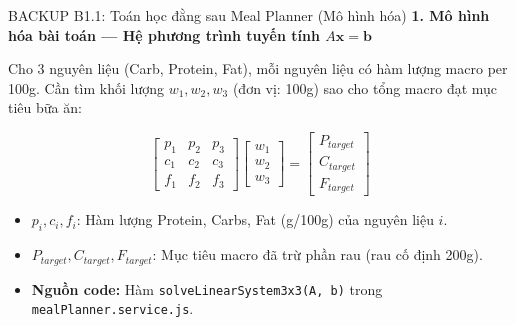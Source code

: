 \documentclass[10pt, aspectratio=169]{beamer}
\begin{document}
\begin{frame}[label=b1_1]{BACKUP B1.1: Toán học đằng sau Meal Planner (Mô hình hóa)}
\hypertarget{b1_1_target}{}
    \textbf{1. Mô hình hóa bài toán — Hệ phương trình tuyến tính $A\mathbf{x} = \mathbf{b}$}
    \vspace{0.2cm}
    
    Cho 3 nguyên liệu (Carb, Protein, Fat), mỗi nguyên liệu có hàm lượng macro per 100g. Cần tìm khối lượng $w_1, w_2, w_3$ (đơn vị: 100g) sao cho tổng macro đạt mục tiêu bữa ăn:

    $$ \begin{bmatrix} p_1 & p_2 & p_3 \\ c_1 & c_2 & c_3 \\ f_1 & f_2 & f_3 \end{bmatrix} \begin{bmatrix} w_1 \\ w_2 \\ w_3 \end{bmatrix} = \begin{bmatrix} P_{target} \\ C_{target} \\ F_{target} \end{bmatrix} $$

    \begin{itemize}
        \small
        \item $p_i, c_i, f_i$: Hàm lượng Protein, Carbs, Fat (g/100g) của nguyên liệu $i$.
        \item $P_{target}, C_{target}, F_{target}$: Mục tiêu macro đã trừ phần rau (rau cố định 200g).
        \item \textbf{Nguồn code:} Hàm \texttt{solveLinearSystem3x3(A, b)} trong \texttt{mealPlanner.service.js}.
    \end{itemize}
\end{frame}
\end{document}
